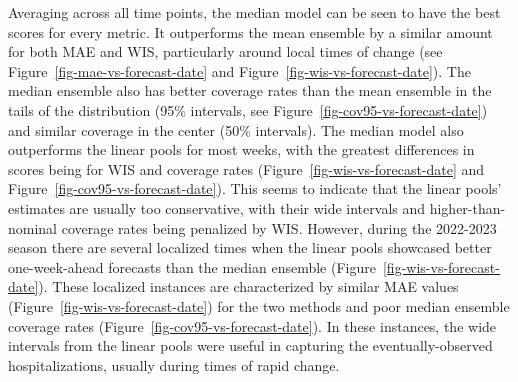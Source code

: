 \documentclass[
  letterpaper,
  DIV=11,
  numbers=noendperiod]{scrartcl}
\begin{document}
Averaging across all time points, the median model can be seen to have
the best scores for every metric. It outperforms the mean ensemble by a
similar amount for both MAE and WIS, particularly around local times of
change (see Figure~\ref{fig-mae-vs-forecast-date} and
Figure~\ref{fig-wis-vs-forecast-date}). The median ensemble also has
better coverage rates than the mean ensemble in the tails of the
distribution (95\% intervals, see
Figure~\ref{fig-cov95-vs-forecast-date}) and similar coverage in the
center (50\% intervals). The median model also outperforms the linear
pools for most weeks, with the greatest differences in scores being for
WIS and coverage rates (Figure~\ref{fig-wis-vs-forecast-date} and
Figure~\ref{fig-cov95-vs-forecast-date}). This seems to indicate that
the linear pools' estimates are usually too conservative, with their
wide intervals and higher-than-nominal coverage rates being penalized by
WIS. However, during the 2022-2023 season there are several localized
times when the linear pools showcased better one-week-ahead forecasts
than the median ensemble (Figure~\ref{fig-wis-vs-forecast-date}). These
localized instances are characterized by similar MAE values
(Figure~\ref{fig-wis-vs-forecast-date}) for the two methods and poor
median ensemble coverage rates
(Figure~\ref{fig-cov95-vs-forecast-date}). In these instances, the wide
intervals from the linear pools were useful in capturing the
eventually-observed hospitalizations, usually during times of rapid
change.
\end{document}
